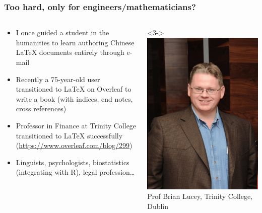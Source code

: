\begin{frame}
\frametitle{Too hard, only for engineers/mathematicians?}

\begin{columns}[T]
\begin{column}{0.58\textwidth}
\begin{itemize}[<+->]
\item I once guided a student in the humanities to learn authoring Chinese \LaTeX{} documents entirely through e-mail
\item Recently a 75-year-old user transitioned to \LaTeX{} on Overleaf to write a book (with indices, end notes, cross references)
\item Professor in Finance at Trinity College transitioned to \LaTeX{} successfully (\url{https://www.overleaf.com/blog/299})
\item Linguists, psychologists, biostatistics (integrating with R), legal profession\ldots
\end{itemize}
\end{column}
\hfill
\begin{column}{.29\textwidth}<3->
\includegraphics[width=\linewidth]{brian-lucey-full}\\
{\footnotesize Prof Brian Lucey, Trinity College, Dublin}
\end{column}
\end{columns}

\end{frame}

